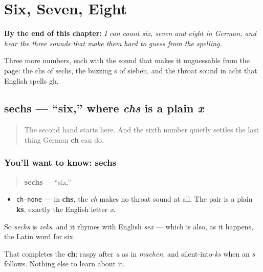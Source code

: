 
\chapter{Six, Seven, Eight}
\label{ch:ge-zahlen-6-8}

\begin{chapteropening}
\textbf{By the end of this chapter:} \emph{I can count six, seven and eight in German, and hear the three sounds that make them hard to guess from the spelling.}

Three more numbers, each with the sound that makes it unguessable from the page: the chs of sechs, the buzzing s of sieben, and the throat sound in acht that English spells gh.
\end{chapteropening}

\section[sechs]{sechs — \textquotedblleft{}six,\textquotedblright{} where \emph{chs} is a plain \emph{x}}

\label{lesson:GE-C06-sechs}



\begin{quote}
The second hand starts here. And the sixth number quietly settles the last thing German \textbf{ch} can do.
\end{quote}

\subsection*{You'll want to know: sechs}
\begin{quote}
\textbf{sechs} — \textquotedblleft{}six.\textquotedblright{}
\end{quote}

\begin{sounds}
\begin{itemize}
\raggedright
  \item \texttt{ch-none} — in \textbf{chs}, the \emph{ch} makes no throat sound at all. The pair is a plain \textbf{ks}, exactly the English letter \emph{x}.
\end{itemize}

So \emph{sechs} is \emph{zeks}, and it rhymes with English \emph{sex} — which is also, as it happens, the Latin word for six.

That completes the \textbf{ch}: raspy after \emph{a} as in \emph{machen}, and silent-into-\emph{ks} when an \emph{s} follows. Nothing else to learn about it.
\end{sounds}


